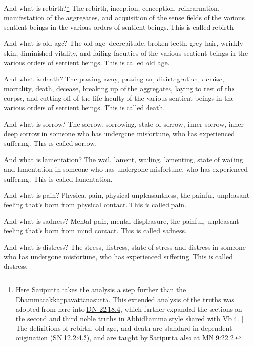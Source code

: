 \documentclass[12pt,openany]{book}%
\begin{document}
And what is rebirth?\footnote{Here \textsanskrit{Sāriputta} takes the analysis a step further than the Dhammacakkappavattanasutta. This extended analysis of the truths was adopted from here into \href{https://suttacentral.net/dn22/en/sujato\#18.4}{DN 22:18.4}, which further expanded the sections on the second and third noble truths in Abhidhamma style shared with \href{https://suttacentral.net/vb4/en/sujato}{Vb 4}. | The definitions of rebirth, old age, and death are standard in dependent origination (\href{https://suttacentral.net/sn12.2/en/sujato\#4.2}{SN 12.2:4.2}), and are taught by \textsanskrit{Sāriputta} also at \href{https://suttacentral.net/mn9/en/sujato\#22.2}{MN 9:22.2}. } The rebirth, inception, conception, reincarnation, manifestation of the aggregates, and acquisition of the sense fields of the various sentient beings in the various orders of sentient beings. This is called rebirth. 

And what is old age? The old age, decrepitude, broken teeth, grey hair, wrinkly skin, diminished vitality, and failing faculties of the various sentient beings in the various orders of sentient beings. This is called old age. 

And what is death? The passing away, passing on, disintegration, demise, mortality, death, decease, breaking up of the aggregates, laying to rest of the corpse, and cutting off of the life faculty of the various sentient beings in the various orders of sentient beings. This is called death. 

And what is sorrow? The sorrow, sorrowing, state of sorrow, inner sorrow, inner deep sorrow in someone who has undergone misfortune, who has experienced suffering. This is called sorrow. 

And what is lamentation? The wail, lament, wailing, lamenting, state of wailing and lamentation in someone who has undergone misfortune, who has experienced suffering. This is called lamentation. 

And what is pain? Physical pain, physical unpleasantness, the painful, unpleasant feeling that’s born from physical contact. This is called pain. 

And what is sadness? Mental pain, mental displeasure, the painful, unpleasant feeling that’s born from mind contact. This is called sadness. 

And what is distress? The stress, distress, state of stress and distress in someone who has undergone misfortune, who has experienced suffering. This is called distress. 
\end{document}
